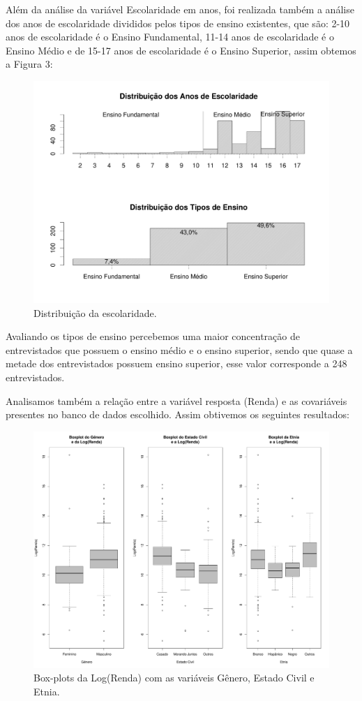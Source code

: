 \documentclass[]{article}
\begin{document}
Além da análise da variável Escolaridade em anos, foi realizada também a
análise dos anos de escolaridade divididos pelos tipos de ensino
existentes, que são: 2-10 anos de escolaridade é o Ensino Fundamental,
11-14 anos de escolaridade é o Ensino Médio e de 15-17 anos de
escolaridade é o Ensino Superior, assim obtemos a Figura 3:

\begin{figure}[H]

{\centering \includegraphics[width=0.6\linewidth]{p102-graf} 

}

\caption{Distribuição da escolaridade.}\label{fig:unnamed-chunk-10}
\end{figure}

Avaliando os tipos de ensino percebemos uma maior concentração de
entrevistados que possuem o ensino médio e o ensino superior, sendo que
quase a metade dos entrevistados possuem ensino superior, esse valor
corresponde a 248 entrevistados.

Analisamos também a relação entre a variável resposta (Renda) e as
covariáveis presentes no banco de dados escolhido. Assim obtivemos os
seguintes resultados:

\begin{figure}[H]

{\centering \includegraphics[width=0.8\linewidth]{p103-graf} 

}

\caption{Box-plots da Log(Renda) com as variáveis Gênero, Estado Civil e Etnia.}\label{fig:unnamed-chunk-11}
\end{figure}
\end{document}
